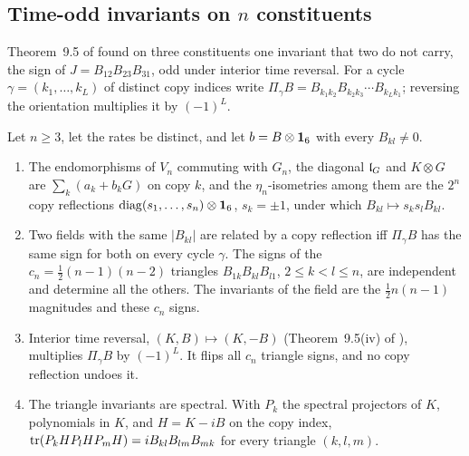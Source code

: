 \subsection{\texorpdfstring{Time-odd invariants on $n$ constituents}{Time-odd invariants on n constituents}}
\label{e4:sec:cycles}

Theorem~9.5 of \cite{RE} found on three constituents one invariant that two do not carry, the sign of $J=B_{12}B_{23}B_{31}$, odd under interior
time reversal. For a cycle $\gamma=(k_1,\dots,k_L)$ of distinct copy indices write $\Pi_\gamma B=B_{k_1k_2}B_{k_2k_3}\cdots B_{k_Lk_1}$; reversing the
orientation multiplies it by $(-1)^L$.

\begin{theorem}
\label{e4:thm:cycles}
Let $n\ge3$, let the rates be distinct, and let $b=B\otimes\mathbf 1_6$ with every $B_{kl}\neq0$.
\begin{enumerate}[label=(\roman*),leftmargin=2.2em]
\item The endomorphisms of $V_n$ commuting with $G_n$, the diagonal $\mathfrak l_G$ and $K\otimes G$ are $\sum_k(a_k+b_kG)$ on copy $k$, and the $\eta_n$-isometries
among them are the $2^n$ copy reflections $\operatorname{diag}(s_1,\dots,s_n)\otimes\mathbf 1_6$, $s_k=\pm1$, under which $B_{kl}\mapsto s_ks_lB_{kl}$.
\item Two fields with the same $|B_{kl}|$ are related by a copy reflection iff $\Pi_\gamma B$ has the same sign for both on every cycle $\gamma$. The
signs of the $c_n=\tfrac12(n-1)(n-2)$ triangles $B_{1k}B_{kl}B_{l1}$, $2\le k<l\le n$, are independent and determine all the others. The
invariants of the field are the $\tfrac12n(n-1)$ magnitudes and these $c_n$ signs.
\item Interior time reversal, $(K,B)\mapsto(K,-B)$ (Theorem~9.5(iv) of \cite{RE}), multiplies $\Pi_\gamma B$ by $(-1)^L$. It flips all $c_n$ triangle signs,
and no copy reflection undoes it.
\item The triangle invariants are spectral. With $P_k$ the spectral projectors of $K$, polynomials in $K$, and $H=K-iB$ on the copy index,
$\operatorname{tr}(P_kHP_lHP_mH)=iB_{kl}B_{lm}B_{mk}$ for every triangle $(k,l,m)$.
\end{enumerate}
\end{theorem}

